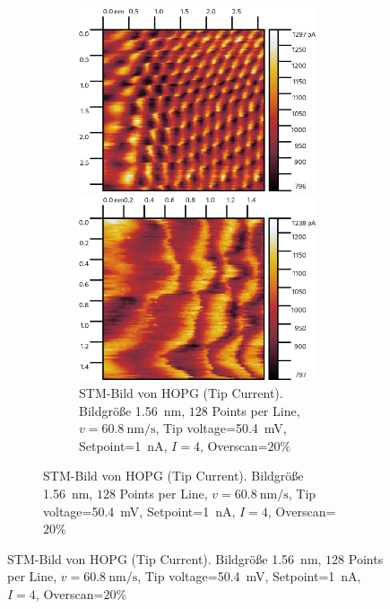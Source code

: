 \documentclass{article}
\begin{document}
\begin{figure}[h]
\begin{figure}[h]
\begin{figure}[h]
\begin{minipage}{0.49\textwidth}
        \includegraphics[width=\textwidth]{Image20215}
        \caption{
            STM-Bild von HOPG (Tip Current). Bildgröße \SI{3.125}{\nm}, $128$ Points per Line,
            $v=\SI{121.6}{\nm\per\s}$, Tip voltage=\SI{50.4}{\mV}, Setpoint=\SI{1}{\nA}, $I=4$, Overscan=$10\%$
        }
        \label{fig:hopg-2}
    \end{minipage}

    \begin{minipage}{0.49\textwidth}
        \centering
        \includegraphics[width=\textwidth]{Image20221.jpg}
        \caption{
            STM-Bild von HOPG (Tip Current). Bildgröße \SI{1.56}{\nm}, $128$ Points per Line,
            $v=\SI{60.8}{\nm\per\s}$, Tip voltage=\SI{50.4}{\mV}, Setpoint=\SI{1}{\nA}, $I=4$, Overscan=$20\%$
        }
        \label{fig:hopg-3}
    \end{minipage}
\end{figure}




\end{figure}
\end{figure}
\end{document}
